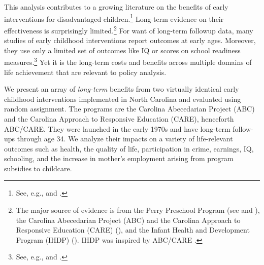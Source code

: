 This analysis contributes to a growing literature on the benefits of early interventions for disadvantaged children.\footnote{See, e.g., \cite{Currie_2011_AER} and \cite{Elango_Hojman_etal_2016_Early-Edu}.} Long-term evidence on their effectiveness is surprisingly limited.\footnote{The major source of evidence is from the Perry Preschool Program (see \citealp{Schweinhart_Montie_ea_2005_BOOKlifetime} and \citealp{Heckman_Moon_etal_2010_RateofReturn,Heckman_Moon_etal_2010_QE}), the Carolina Abecedarian Project (ABC) and the Carolina Approach to Responsive Education (CARE) (\citealp{Ramey_Campbell_etal_2000_ADS,Ramey-etal_2012-ABC}), and the Infant Health and Development Program (IHDP) (\citealp{Gross_Spiker_etal_1997_BOOKHelpinglowbirth,Duncan_Sojourner_2013_JHR}). IHDP was inspired by ABC/CARE \citep[][]{Gross_Spiker_etal_1997_BOOKHelpinglowbirth}.} For want of long-term followup data, many studies of early childhood interventions report outcomes at early ages. Moreover, they use only a limited set of outcomes like IQ or scores on school readiness measures.\footnote{See, e.g., \cite{Kline_Walters_2014_EvaluatingPublicPrograms} and \cite{Weiland_2013_CD_Impacts-of-Pre-K}.} Yet it is the long-term costs and benefits across multiple domains of life achievement that are relevant to policy analysis.

We present an array of \emph{long-term} benefits from two virtually identical early childhood interventions implemented in North Carolina and evaluated using random assignment. The programs are the Carolina Abecedarian Project (ABC) and the Carolina Approach to Responsive Education (CARE), henceforth ABC/CARE. They were launched in the early 1970s and have long-term follow-ups through age 34. We analyze their impacts on a variety of life-relevant outcomes such as health, the quality of life, participation in crime, earnings, IQ, schooling, and the increase in mother's employment arising from program subsidies to childcare.

